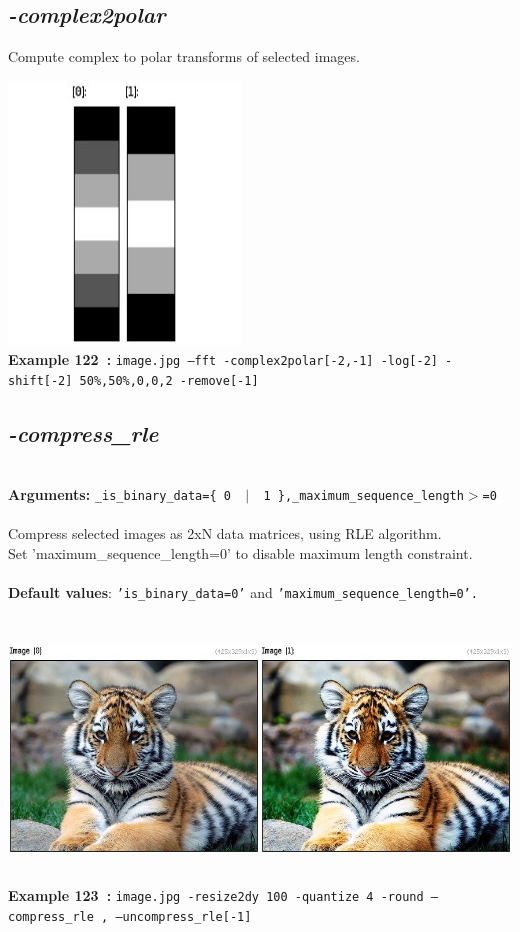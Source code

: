 \documentclass[a4paper,11pt,twoside]{book}
\begin{document}
\subsection{\emph{-complex2polar} }\vspace*{-0.5em}
Compute complex to polar transforms of selected images.
\begin{center}\includegraphics[keepaspectratio=true,height=7cm,width=\textwidth]{img/gmic_def122.jpg}\\
{\footnotesize \textbf{Example 122~:} \texttt{image.jpg --fft -complex2polar[-2,-1] -log[-2] -shift[-2] 50\%,50\%,0,0,2 -remove[-1]}}
\end{center}

\subsection{\emph{-compress\_rle} }\vspace*{-0.5em}
~\\\textbf{Arguments: } 
{\small \texttt{\_is\_binary\_data=\{ 0 ~$|$~ 1 \},\_maximum\_sequence\_length$>$=0}}\\~\\
Compress selected images as 2xN data matrices, using RLE algorithm.
~\\Set 'maximum\_sequence\_length=0' to disable maximum length constraint.
~\\~\\\textbf{Default values}: {\small \texttt{'is\_binary\_data=0'} and \texttt{'maximum\_sequence\_length=0'.}}
\begin{center}\includegraphics[keepaspectratio=true,height=7cm,width=\textwidth]{img/gmic_def123.jpg}\\
{\footnotesize \textbf{Example 123~:} \texttt{image.jpg -resize2dy 100 -quantize 4 -round --compress\_rle , --uncompress\_rle[-1]}}
\end{center}
\end{document}
